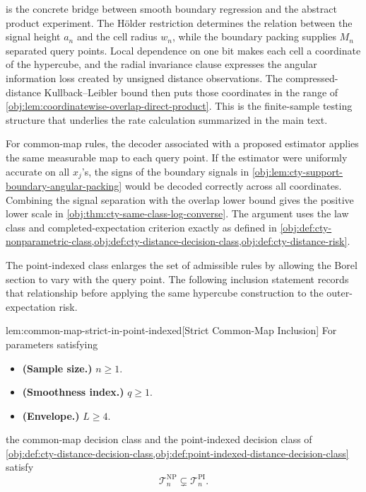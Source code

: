  is the concrete bridge between smooth boundary regression and the abstract product experiment. The Hölder restriction determines the relation between the signal height \(a_n\) and the cell radius \(w_n\), while the boundary packing supplies \(M_n\) separated query points. Local dependence on one bit makes each cell a coordinate of the hypercube, and the radial invariance clause expresses the angular information loss created by unsigned distance observations. The compressed-distance Kullback--Leibler bound then puts those coordinates in the range of \cref{obj:lem:coordinatewise-overlap-direct-product}. This is the finite-sample testing structure that underlies the rate calculation summarized in the main text.

For common-map rules, the decoder associated with a proposed estimator applies the same measurable map to each query point. If the estimator were uniformly accurate on all \(x_j\)'s, the signs of the boundary signals in \cref{obj:lem:cty-support-boundary-angular-packing} would be decoded correctly across all coordinates. Combining the signal separation with the overlap lower bound gives the positive lower scale in \cref{obj:thm:cty-same-class-log-converse}. The argument uses the law class and completed-expectation criterion exactly as defined in \cref{obj:def:cty-nonparametric-class,obj:def:cty-distance-decision-class,obj:def:cty-distance-risk}.

The point-indexed class enlarges the set of admissible rules by allowing the Borel section to vary with the query point. The following inclusion statement records that relationship before applying the same hypercube construction to the outer-expectation risk.

\begin{lemmav}{lem:common-map-strict-in-point-indexed}[Strict Common-Map Inclusion]
For parameters satisfying
\begin{itemize}
\item \textbf{(Sample size.)} \(n\geq 1\).
\item \textbf{(Smoothness index.)} \(q\geq 1\).
\item \textbf{(Envelope.)} \(L\geq 4\).
\end{itemize}
the common-map decision class and the point-indexed decision class of \cref{obj:def:cty-distance-decision-class,obj:def:point-indexed-distance-decision-class} satisfy
\[
\mathcal T_n^{\mathrm{NP}}\subsetneq \mathcal T_n^{\mathrm{PI}}.
\]
\end{lemmav}

